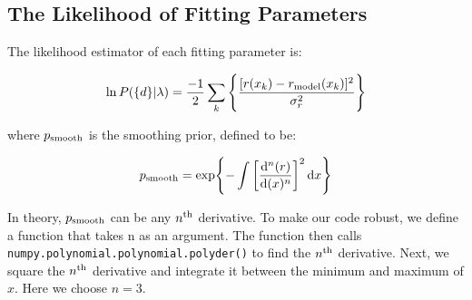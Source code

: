 \subsection{The Likelihood of Fitting Parameters}
\label{subsec:likelihood}

The likelihood estimator of each fitting parameter is:

\begin{equation}
\label{likelihood}
\ln{P(\{d\}|\lambda)} = \frac{-1}{2}\sum_{k} \qty{\frac{[r(x_k) -r_{\rm model}(x_k)]^2}{\sigma_r^2}}
\end{equation}

where $p_{\rm smooth}$ is the smoothing prior, defined to be:

\begin{equation}
\label{smoothing_prior}
p_{\rm smooth} = \exp{-\int \qty[\dv[n]{(r)}{(x)}]^2 \dd{x}}
\end{equation}

In theory, $p_{\rm smooth}$ can be any $n^{\rm th}$ derivative. To make our code robust, we define a function that takes n as an argument. The function then calls \texttt{numpy.polynomial.polynomial.polyder()} to find the $n^{\rm th}$ derivative. Next, we square the $n^{\rm th}$ derivative and integrate it between the minimum and maximum of $x$. Here we choose $n = 3$.